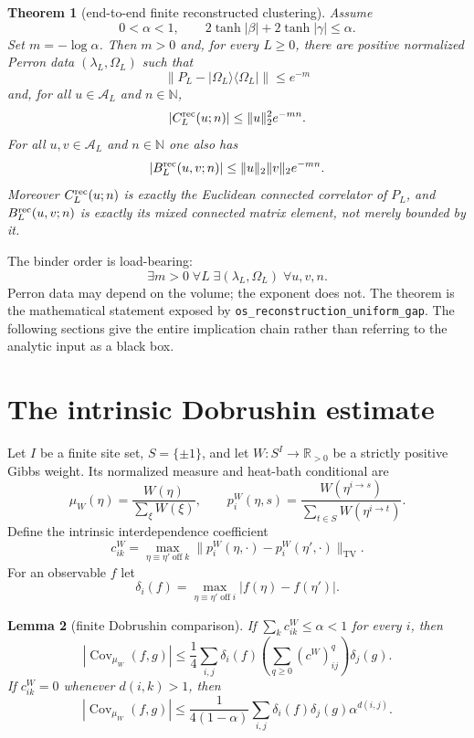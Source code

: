 \documentclass[11pt]{article}
\newtheorem{theorem}{Theorem}[section]
\newtheorem{lemma}[theorem]{Lemma}
\theoremstyle{definition}
\theoremstyle{remark}
\newcommand{\R}{\mathbb{R}}
\newcommand{\cA}{\mathcal{A}}
\newcommand{\Cov}{\operatorname{Cov}}
\newcommand{\TV}{\operatorname{TV}}
\newcommand{\lean}[1]{\nolinkurl{#1}}
\begin{document}
\begin{theorem}[end-to-end finite reconstructed clustering]
\label{thm:main}
Assume
\[
  0<\alpha<1,
  \qquad 2\tanh|\beta|+2\tanh|\gamma|\leq\alpha .
\]
Set $m=-\log\alpha$.  Then $m>0$ and, for every $L\geq0$, there are positive
normalized Perron data $(\lambda_L,\Omega_L)$ such that
\[
  \|P_L-|\Omega_L\rangle\langle\Omega_L|\|\leq e^{-m}
\]
and, for all $u\in\cA_L$ and $n\in\mathbb N$,
\[
  |C^{\rm rec}_L(u;n)|
  \leq \|u\|_2^2 e^{-mn}.
\]
For all $u,v\in\cA_L$ and $n\in\mathbb N$ one also has
\[
  |B^{\rm rec}_L(u,v;n)|
  \leq \|u\|_2\|v\|_2 e^{-mn}.
\]
Moreover $C^{\rm rec}_L(u;n)$ is exactly the Euclidean connected correlator
of $P_L$, and $B^{\rm rec}_L(u,v;n)$ is exactly its mixed connected matrix
element, not merely bounded by it.
\end{theorem}

The binder order is load-bearing:
\[
  \exists m>0\;\forall L\;\exists(\lambda_L,\Omega_L)\;
  \forall u,v,n.
\]
Perron data may depend on the volume; the exponent does not.  The theorem is
the mathematical statement exposed by
\lean{os\_reconstruction\_uniform\_gap}.  The following sections give the
entire implication chain rather than referring to the analytic input as a
black box.

\section{The intrinsic Dobrushin estimate}
\label{sec:dobrushin}

Let $I$ be a finite site set, $S=\{\pm1\}$, and let $W:S^I\to\R_{>0}$ be a
strictly positive Gibbs weight.  Its normalized measure and heat-bath
conditional are
\[
  \mu_W(\eta)=\frac{W(\eta)}{\sum_\xi W(\xi)},
  \qquad
  p_i^W(\eta,s)=
  \frac{W(\eta^{i\to s})}{\sum_{t\in S}W(\eta^{i\to t})}.
\]
Define the intrinsic interdependence coefficient
\[
  c^W_{ik}=
  \max_{\eta\equiv\eta'\;\mathrm{off}\;k}
  \|p_i^W(\eta,\cdot)-p_i^W(\eta',\cdot)\|_{\TV}.
\]
For an observable $f$ let
\[
  \delta_i(f)=\max_{\eta\equiv\eta'\;\mathrm{off}\;i}
  |f(\eta)-f(\eta')|.
\]

\begin{lemma}[finite Dobrushin comparison]
\label{lem:comparison}
If $\sum_k c^W_{ik}\leq\alpha<1$ for every $i$, then
\[
  |\Cov_{\mu_W}(f,g)|
  \leq \frac14\sum_{i,j}\delta_i(f)
       \left(\sum_{q\geq0}(c^W)^q_{ij}\right)\delta_j(g).
\]
If $c^W_{ik}=0$ whenever $d(i,k)>1$, then
\[
  |\Cov_{\mu_W}(f,g)|
  \leq \frac{1}{4(1-\alpha)}
  \sum_{i,j}\delta_i(f)\delta_j(g)\alpha^{d(i,j)}.
\]
\end{lemma}
\end{document}
